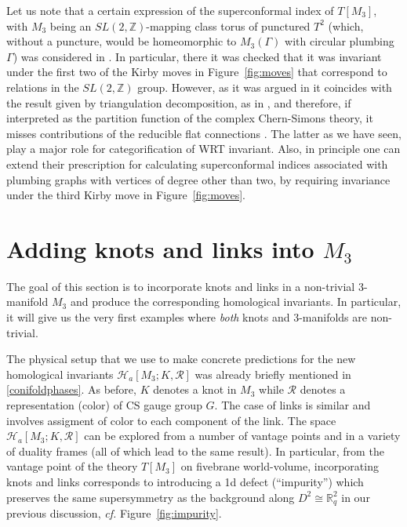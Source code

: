 \documentclass[hyper,letterpaper]{JHEP3}
\newcommand{\Z}{{\mathbb Z}}
\newcommand{\R}{{\mathbb R}}
\def\CH{{\mathcal H}}
\def\CR{{\mathcal R}}
\begin{document}
Let us note that a certain expression of the superconformal index of $T[M_3]$, with $M_3$ being an $SL(2,\Z)$-mapping class torus of punctured $T^2$ (which, without a puncture, would be homeomorphic to $M_3(\Gamma)$ with circular plumbing $\Gamma$) was considered in \cite{Gang:2012ff,Gang:2013sqa}. In particular, there it was checked that it was invariant under the first two of the Kirby moves in Figure~\ref{fig:moves} that correspond to relations in the $SL(2,\Z)$ group. However, as it was argued in \cite{Gang:2013sqa} it coincides with the result given by triangulation decomposition, as in \cite{Dimofte:2011ju,Dimofte:2011py}, and therefore, if interpreted as the partition function of the complex Chern-Simons theory, it misses contributions of the reducible flat connections \cite{Chung:2014qpa}. The latter as we have seen, play a major role for categorification of WRT invariant. Also, in principle one can extend their prescription for calculating superconformal indices associated with plumbing graphs with vertices of degree other than two, by requiring invariance under the third Kirby move in Figure~\ref{fig:moves}.



\section{Adding knots and links into ${M_3}$}

The goal of this section is to incorporate knots and links in a non-trivial 3-manifold $M_3$
and produce the corresponding homological invariants.
In particular, it will give us the very first examples where {\it both} knots and 3-manifolds are non-trivial.

The physical setup that we use to make concrete predictions for the new homological invariants $\CH_a[M_3;K,\CR]$
was already briefly mentioned in \eqref{conifoldphases}. As before, $K$ denotes a knot in $M_3$ while $\CR$ denotes a representation (color) of CS gauge group $G$. The case of links is similar and involves assigment of color to each component of the link. The space $\CH_a[M_3;K,\CR]$ can be explored from a number of vantage points
and in a variety of duality frames (all of which lead to the same result). In particular, from the vantage point
of the theory $T[M_3]$ on fivebrane world-volume, incorporating knots and links corresponds to introducing
a 1d defect (``impurity'') which preserves the same supersymmetry as the background along $D^2 \cong \R^2_q$
in our previous discussion, {\it cf.} Figure~\ref{fig:impurity}.
\end{document}
